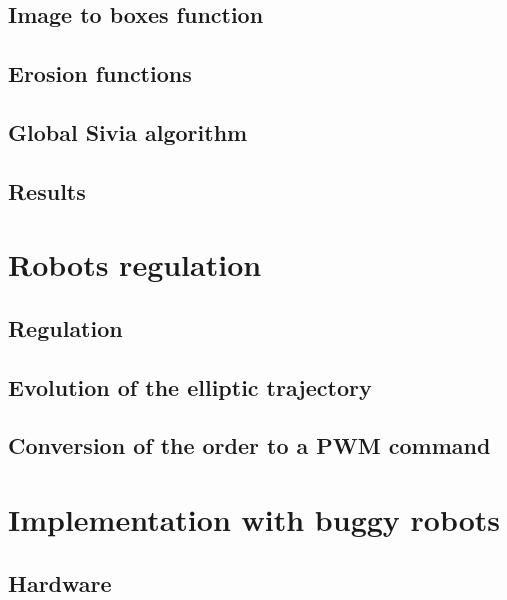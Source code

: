 \documentclass[12pt,fleqn]{report} %
\begin{document}
\section{Image to boxes function}


\section{Erosion functions}


\section{Global Sivia algorithm}


\section{Results}



\chapter{Robots regulation}

\section{Regulation}


\section{Evolution of the elliptic trajectory}


\section{Conversion of the order to a PWM command}



\chapter{Implementation with buggy robots}
\section{Hardware}

\end{document}
